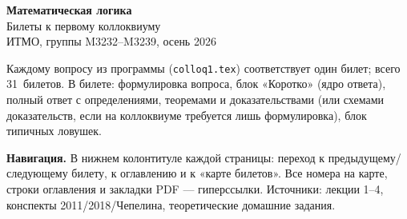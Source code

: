 \documentclass[11pt,a4paper]{article}
\theoremstyle{definition}
\newcommand{\NT}{31}%
\begin{document}
\pagestyle{empty}
\begin{center}
{\LARGE\bfseries Математическая логика}\\[6pt]
{\Large Билеты к первому коллоквиуму}\\[4pt]
{\large ИТМО, группы M3232--M3239, осень 2026}\\[14pt]
\end{center}

Каждому вопросу из программы (\texttt{colloq1.tex}) соответствует один билет;
всего \NT\ билетов. В билете: формулировка вопроса, блок «Коротко»
(ядро ответа), полный ответ с определениями, теоремами и доказательствами
(или схемами доказательств, если на коллоквиуме требуется лишь формулировка),
блок типичных ловушек.

\textbf{Навигация.} В нижнем колонтитуле каждой страницы: переход к предыдущему/следующему
билету, к оглавлению и к «карте билетов». Все номера на карте, строки оглавления и
закладки PDF --- гиперссылки. Источники: лекции 1--4, конспекты 2011/2018/Чепелина,
теоретические домашние задания.

\bigskip
{}\label{toc}
\pagestyle{fancy}
\tableofcontents
\end{document}
